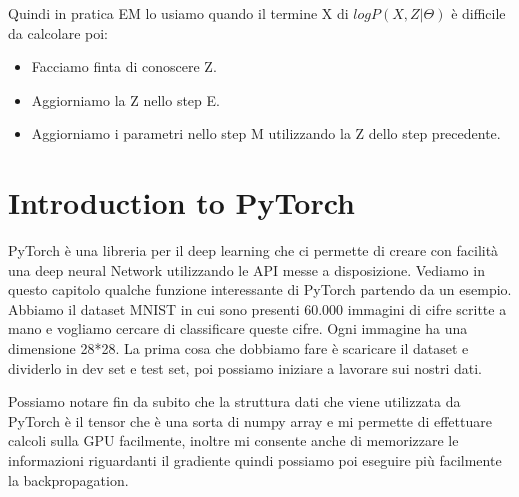 \documentclass[14pt]{extreport}
\begin{document}
Quindi in pratica EM lo usiamo quando il termine X di $log P(X, Z | \Theta)$ è difficile da calcolare poi:
\begin{itemize}
\item Facciamo finta di conoscere Z.
\item Aggiorniamo la Z nello step E.
\item Aggiorniamo i parametri nello step M utilizzando la Z dello step precedente.
\end{itemize}











































\chapter{Introduction to PyTorch}

PyTorch è una libreria per il deep learning che ci permette di creare con facilità una deep neural Network
utilizzando le API messe a disposizione.
Vediamo in questo capitolo qualche funzione interessante di PyTorch partendo da un esempio.
Abbiamo il dataset MNIST in cui sono presenti 60.000 immagini di cifre scritte a mano e vogliamo cercare di 
classificare queste cifre. Ogni immagine ha una dimensione 28*28.
La prima cosa che dobbiamo fare è scaricare il dataset e dividerlo in dev set e test set, poi possiamo 
iniziare a lavorare sui nostri dati.

Possiamo notare fin da subito che la struttura dati che viene utilizzata da PyTorch è il tensor che è una sorta
di numpy array e mi permette di effettuare calcoli sulla GPU facilmente, inoltre mi consente anche di memorizzare
le informazioni riguardanti il gradiente quindi possiamo poi eseguire più facilmente la backpropagation.
\end{document}
